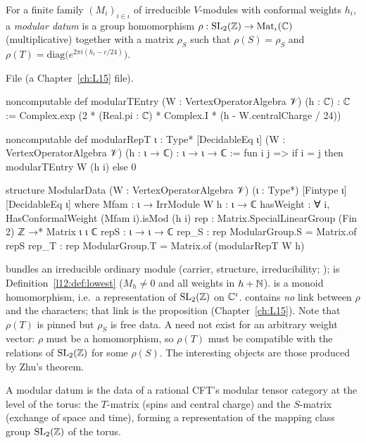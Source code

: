 \begin{definition}\label{l14:def:moddata}
For a finite family $(M_i)_{i\in\iota}$ of irreducible $V$-modules with conformal weights $h_i$, a \emph{modular datum} is a
group homomorphism $\rho:\mathrm{SL}_2(\mathbb{Z})\to\mathrm{Mat}_\iota({\mathbb{C}})$ (multiplicative) together with a matrix $\rho_S$ such that
$\rho(S) = \rho_S$ and $\rho(T) = \mathrm{diag}\bigl(e^{2\pi i(h_i-c/24)}\bigr)$.
\end{definition}
\noindent File  (a Chapter~\ref{ch:L15} file).
\begin{leancode}
noncomputable def modularTEntry (W : VertexOperatorAlgebra 𝒱) (h : ℂ) : ℂ :=
  Complex.exp (2 * (Real.pi : ℂ) * Complex.I * (h - W.centralCharge / 24))

noncomputable def modularRepT {ι : Type*} [DecidableEq ι] (W : VertexOperatorAlgebra 𝒱)
    (h : ι → ℂ) : ι → ι → ℂ :=
  fun i j => if i = j then modularTEntry W (h i) else 0

structure ModularData (W : VertexOperatorAlgebra 𝒱) (ι : Type*) [Fintype ι] [DecidableEq ι] where
  Mfam : ι → IrrModule W
  h : ι → ℂ
  hasWeight : ∀ i, HasConformalWeight (Mfam i).isMod (h i)
  rep : Matrix.SpecialLinearGroup (Fin 2) ℤ →* Matrix ι ι ℂ
  repS : ι → ι → ℂ
  rep_S : rep ModularGroup.S = Matrix.of repS
  rep_T : rep ModularGroup.T = Matrix.of (modularRepT W h)
\end{leancode}
\begin{dictionary}
 bundles an irreducible ordinary module (carrier, structure, irreducibility; );
 is Definition~\ref{l12:def:lowest} ($M_h\neq0$ and all weights in $h+{\mathbb{N}}$).  is a monoid
homomorphism, i.e.\ a representation of $\mathrm{SL}_2(\mathbb{Z})$ on ${\mathbb{C}}^\iota$.  contains \emph{no} link between
$\rho$ and the characters; that link is the proposition  (Chapter~\ref{ch:L15}). Note that
$\rho(T)$ is pinned but $\rho_S$ is free data. A  need not exist for an arbitrary weight vector: $\rho$
must be a homomorphism, so $\rho(T)$ must be compatible with the relations of $\mathrm{SL}_2(\mathbb{Z})$ for some $\rho(S)$. The interesting objects are those produced by Zhu's theorem.
\end{dictionary}
\begin{physics}
A modular datum is the data of a rational CFT's modular tensor category at the level of the torus: the $T$-matrix (spins and central charge) and the $S$-matrix (exchange of space and time), forming a representation of the mapping class group $\mathrm{SL}_2(\mathbb{Z})$ of the torus.
\end{physics}

